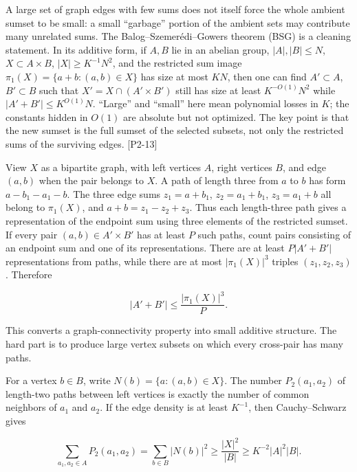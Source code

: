 \hypertarget{04-visual-computing-ii-ch033-from-many-additive-coincidences-to-a-genuinely-structured-rectangle-1}{}

A large set of graph edges with few sums does not itself force the whole ambient sumset to be small: a small ``garbage'' portion of the ambient sets may contribute many unrelated sums. The Balog--Szemerédi--Gowers theorem (BSG) is a cleaning statement. In its additive form, if \(A,B\) lie in an abelian group, \(|A|,|B|\le N\), \(X\subset A\times B\), \(|X|\ge K^{-1}N^2\), and the restricted sum image \(\pi_1(X)=\{a+b:(a,b)\in X\}\) has size at most \(KN\), then one can find \(A'\subset A\), \(B'\subset B\) such that \(X'=X\cap(A'\times B')\) still has size at least \(K^{-O(1)}N^2\) while \(|A'+B'|\le K^{O(1)}N\). ``Large'' and ``small'' here mean polynomial losses in \(K\); the constants hidden in \(O(1)\) are absolute but not optimized. The key point is that the new sumset is the full sumset of the selected subsets, not only the restricted sums of the surviving edges. {[}P2-13{]}

View \(X\) as a bipartite graph, with left vertices \(A\), right vertices \(B\), and edge \((a,b)\) when the pair belongs to \(X\). A path of length three from \(a\) to \(b\) has form \(a-b_1-a_1-b\). The three edge sums \(z_1=a+b_1\), \(z_2=a_1+b_1\), \(z_3=a_1+b\) all belong to \(\pi_1(X)\), and \(a+b=z_1-z_2+z_3\). Thus each length-three path gives a representation of the endpoint sum using three elements of the restricted sumset. If every pair \((a,b)\in A'\times B'\) has at least \(P\) such paths, count pairs consisting of an endpoint sum and one of its representations. There are at least \(P|A'+B'|\) representations from paths, while there are at most \(|\pi_1(X)|^3\) triples \((z_1,z_2,z_3)\). Therefore

\[|A'+B'|\le \frac{|\pi_1(X)|^3}{P}.\]

This converts a graph-connectivity property into small additive structure. The hard part is to produce large vertex subsets on which every cross-pair has many paths.

For a vertex \(b\in B\), write \(N(b)=\{a:(a,b)\in X\}\). The number \(P_2(a_1,a_2)\) of length-two paths between left vertices is exactly the number of common neighbors of \(a_1\) and \(a_2\). If the edge density is at least \(K^{-1}\), then Cauchy--Schwarz gives

\[\sum_{a_1,a_2\in A}P_2(a_1,a_2)=\sum_{b\in B}|N(b)|^2\ge \frac{|X|^2}{|B|}\ge K^{-2}|A|^2|B|.\]

